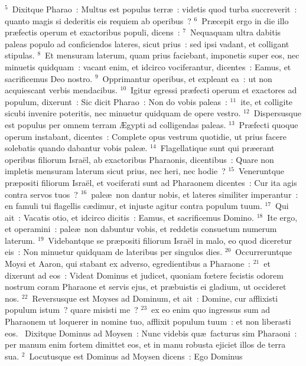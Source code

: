 ${}^{5}$~Dixitque Pharao~: Multus est populus terr\ae~: videtis quod turba succreverit~: quanto magis si dederitis eis requiem ab operibus~?
${}^{6}$~Pr\ae cepit ergo in die illo pr\ae fectis operum et exactoribus populi, dicens~:
${}^{7}$~Nequaquam ultra dabitis paleas populo ad conficiendos lateres, sicut prius~: sed ipsi vadant, et colligant stipulas.
${}^{8}$~Et mensuram laterum, quam prius faciebant, imponetis super eos, nec minuetis quidquam~: vacant enim, et idcirco vociferantur, dicentes~: Eamus, et sacrificemus Deo nostro.
${}^{9}$~Opprimantur operibus, et expleant ea~: ut non acquiescant verbis mendacibus.
${}^{10}$~Igitur egressi pr\ae fecti operum et exactores ad populum, dixerunt~: Sic dicit Pharao~: Non do vobis paleas~:
${}^{11}$~ite, et colligite sicubi invenire poteritis, nec minuetur quidquam de opere vestro.
${}^{12}$~Dispersusque est populus per omnem terram \AE gypti ad colligendas paleas.
${}^{13}$~Pr\ae fecti quoque operum instabant, dicentes~: Complete opus vestrum quotidie, ut prius facere solebatis quando dabantur vobis pale\ae .
${}^{14}$~Flagellatique sunt qui pr\ae erant operibus filiorum Isra\"el, ab exactoribus Pharaonis, dicentibus~: Quare non impletis mensuram laterum sicut prius, nec heri, nec hodie~?
${}^{15}$~Veneruntque pr\ae positi filiorum Isra\"el, et vociferati sunt ad Pharaonem dicentes~: Cur ita agis contra servos tuos~?
${}^{16}$~pale\ae\ non dantur nobis, et lateres similiter imperantur~: en famuli tui flagellis c\ae dimur, et injuste agitur contra populum tuum.
${}^{17}$~Qui ait~: Vacatis otio, et idcirco dicitis~: Eamus, et sacrificemus Domino.
${}^{18}$~Ite ergo, et operamini~: pale\ae\ non dabuntur vobis, et reddetis consuetum numerum laterum.
${}^{19}$~Videbantque se pr\ae positi filiorum Isra\"el in malo, eo quod diceretur eis~: Non minuetur quidquam de lateribus per singulos dies.
${}^{20}$~Occurreruntque Moysi et Aaron, qui stabant ex adverso, egredientibus a Pharaone~:
${}^{21}$~et dixerunt ad eos~: Videat Dominus et judicet, quoniam fœtere fecistis odorem nostrum coram Pharaone et servis ejus, et pr\ae buistis ei gladium, ut occideret nos.
${}^{22}$~Reversusque est Moyses ad Dominum, et ait~: Domine, cur afflixisti populum istum~? quare misisti me~?
${}^{23}$~ex eo enim quo ingressus sum ad Pharaonem ut loquerer in nomine tuo, afflixit populum tuum~: et non liberasti eos.
~Dixitque Dominus ad Moysen~: Nunc videbis qu\ae\ facturus sim Pharaoni~: per manum enim fortem dimittet eos, et in manu robusta ejiciet illos de terra sua.
${}^{2}$~Locutusque est Dominus ad Moysen dicens~: Ego Dominus

